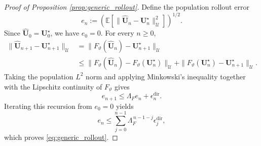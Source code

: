 \documentclass[11pt]{article}
\begin{document}
\begin{proof}[Proof of Proposition \ref{prop:generic_rollout}]
Define the population rollout error
\[
e_n
:=
\left(
\mathbb E
\left[
\|\widehat{\mathbf U}_n-\mathbf U_n^\star\|_{\mathcal U}^2
\right]
\right)^{1/2}.
\]
Since $\widehat{\mathbf U}_0=\mathbf U_0^\star$, we have $e_0=0$. For every
$n\geq0$,
\begin{align*}
\|\widehat{\mathbf U}_{n+1}-\mathbf U_{n+1}^\star\|_{\mathcal U}
&=
\|F_\vartheta(\widehat{\mathbf U}_n)-\mathbf U_{n+1}^\star\|_{\mathcal U}
\\
&\leq
\|F_\vartheta(\widehat{\mathbf U}_n)
-F_\vartheta(\mathbf U_n^\star)\|_{\mathcal U}
+
\|F_\vartheta(\mathbf U_n^\star)-\mathbf U_{n+1}^\star\|_{\mathcal U}.
\end{align*}
Taking the population $L^2$ norm and applying Minkowski's inequality together
with the Lipschitz continuity of $F_\vartheta$ gives
\[
e_{n+1}
\leq
\Lambda_F e_n+\epsilon_n^{\mathrm{dir}}.
\]
Iterating this recursion from $e_0=0$ yields
\[
e_n
\leq
\sum_{j=0}^{n-1}
\Lambda_F^{\,n-1-j}\epsilon_j^{\mathrm{dir}},
\]
which proves \eqref{eq:generic_rollout}.
\end{proof}
\end{document}
